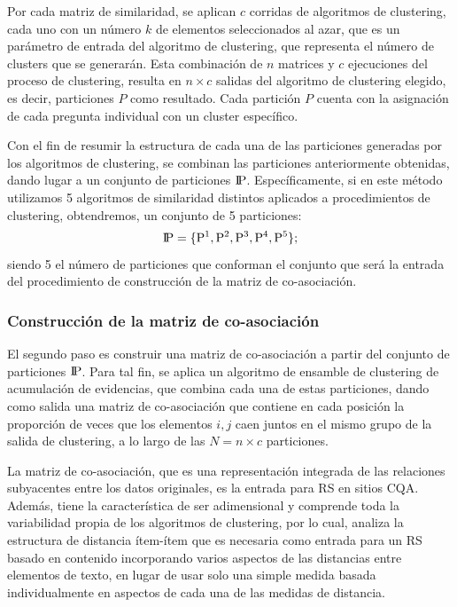 \bigskip Por cada matriz de similaridad, se aplican \(c\) corridas de algoritmos de clustering, cada uno con un número \(k\) de elementos seleccionados al azar, que es un parámetro de entrada del algoritmo de clustering, que representa el número de clusters que se generarán. Esta combinación de \(n\) matrices y \(c\) ejecuciones del proceso de clustering, resulta en \(n \times c\) salidas del algoritmo de clustering elegido, es decir, particiones \(P\) como resultado. Cada partición \(P\) cuenta con la asignación de cada pregunta individual con un cluster específico.

\bigskip Con el fin de resumir la estructura de cada una de las particiones generadas por los algoritmos de clustering, se combinan las particiones anteriormente obtenidas, dando lugar a un conjunto de particiones  \(\rm I\!P\). Específicamente, si en este método utilizamos 5 algoritmos de similaridad distintos aplicados a procedimientos de clustering, obtendremos, un conjunto de 5 particiones:
\[\rm I\!P = \{P^1, P^2, P^3, P^4, P^5\};\]
siendo 5 el número de particiones que conforman el conjunto que será la entrada del procedimiento de construcción de la matriz de co-asociación.

\subsubsection{Construcción de la matriz de co-asociación}
El segundo paso es construir una matriz de co-asociación a partir del conjunto de particiones \(\rm I\!P\). Para tal fin, se aplica un algoritmo de ensamble de clustering de acumulación de evidencias, que combina cada una de estas particiones, dando como salida una matriz de co-asociación que contiene en cada posición la proporción de veces que los elementos \(i,j\) caen juntos en el mismo grupo de la salida de clustering, a lo largo de las \(N=n \times c\) particiones.

\bigskip La matriz de co-asociación, que es una representación integrada de las relaciones subyacentes entre los datos originales, es la entrada para RS en sitios CQA. Además, tiene la característica de ser adimensional y comprende toda la variabilidad propia de los algoritmos de clustering, por lo cual, analiza la estructura de distancia ítem-ítem que es necesaria como entrada para un RS basado en contenido incorporando varios aspectos de las distancias entre elementos de texto, en lugar de usar solo una simple medida basada individualmente en aspectos de cada una de las medidas de distancia.

